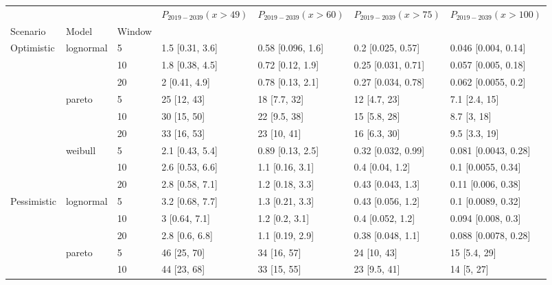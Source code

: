 \begin{tabular}{lllllll}
\toprule
           &         &    & $P_{2019-2039}(x>49)$ & $P_{2019-2039}(x>60)$ & $P_{2019-2039}(x>75)$ & $P_{2019-2039}(x>100)$ \\
Scenario & Model & Window &                       &                       &                       &                        \\
\midrule
Optimistic & lognormal & 5  &       1.5 [0.31, 3.6] &     0.58 [0.096, 1.6] &     0.2 [0.025, 0.57] &    0.046 [0.004, 0.14] \\
           &         & 10 &       1.8 [0.38, 4.5] &      0.72 [0.12, 1.9] &    0.25 [0.031, 0.71] &    0.057 [0.005, 0.18] \\
           &         & 20 &         2 [0.41, 4.9] &      0.78 [0.13, 2.1] &    0.27 [0.034, 0.78] &    0.062 [0.0055, 0.2] \\
           & pareto & 5  &           25 [12, 43] &          18 [7.7, 32] &          12 [4.7, 23] &          7.1 [2.4, 15] \\
           &         & 10 &           30 [15, 50] &          22 [9.5, 38] &          15 [5.8, 28] &            8.7 [3, 18] \\
           &         & 20 &           33 [16, 53] &           23 [10, 41] &          16 [6.3, 30] &          9.5 [3.3, 19] \\
           & weibull & 5  &       2.1 [0.43, 5.4] &      0.89 [0.13, 2.5] &    0.32 [0.032, 0.99] &   0.081 [0.0043, 0.28] \\
           &         & 10 &       2.6 [0.53, 6.6] &       1.1 [0.16, 3.1] &       0.4 [0.04, 1.2] &     0.1 [0.0055, 0.34] \\
           &         & 20 &       2.8 [0.58, 7.1] &       1.2 [0.18, 3.3] &     0.43 [0.043, 1.3] &     0.11 [0.006, 0.38] \\
Pessimistic & lognormal & 5  &       3.2 [0.68, 7.7] &       1.3 [0.21, 3.3] &     0.43 [0.056, 1.2] &     0.1 [0.0089, 0.32] \\
           &         & 10 &         3 [0.64, 7.1] &        1.2 [0.2, 3.1] &      0.4 [0.052, 1.2] &     0.094 [0.008, 0.3] \\
           &         & 20 &        2.8 [0.6, 6.8] &       1.1 [0.19, 2.9] &     0.38 [0.048, 1.1] &   0.088 [0.0078, 0.28] \\
           & pareto & 5  &           46 [25, 70] &           34 [16, 57] &           24 [10, 43] &           15 [5.4, 29] \\
           &         & 10 &           44 [23, 68] &           33 [15, 55] &          23 [9.5, 41] &             14 [5, 27] \\

\end{tabular}
